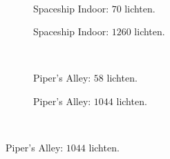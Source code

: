 \begin{figure}[t]
\begin{subfigure}[b]{\textwidth}
  \end{subfigure}\hfill\\
  \begin{adjustbox}{minipage=\textwidth, scale=0.55}
    \begin{subfigure}[b]{0.8\textwidth}
      \centering
      \def\svgwidth{\textwidth}
      
      \caption{Spaceship Indoor: $70$ lichten.}
      \label{fig:hs-seed-memory::si-low}
    \end{subfigure}
  \end{adjustbox} %
  \begin{adjustbox}{minipage=\textwidth, scale=0.55}
    \begin{subfigure}[b]{0.8\textwidth}
      \centering
      \def\svgwidth{\textwidth}
      
      \caption{Spaceship Indoor: $1260$ lichten.}
      \label{fig:hs-seed-memory::si-high}
    \end{subfigure}
  \end{adjustbox} \\
  \begin{adjustbox}{minipage=\textwidth, scale=0.55}
    \begin{subfigure}[b]{0.8\textwidth}
      \centering
      \def\svgwidth{\textwidth}
      
      \caption{Piper's Alley: $58$ lichten.}
      \label{fig:hs-seed-memory::pa-low}
    \end{subfigure}
  \end{adjustbox} %
  \begin{adjustbox}{minipage=\textwidth, scale=0.55}
    \begin{subfigure}[b]{0.8\textwidth}
      \centering
      \def\svgwidth{\textwidth}
      
      \caption{Piper's Alley: $1044$ lichten.}
      \label{fig:hs-seed-memory::pa-high}
    \end{subfigure}
  \end{adjustbox} \\
  \begin{adjustbox}{minipage=\textwidth, scale=0.55}

\end{adjustbox}
\end{figure}
